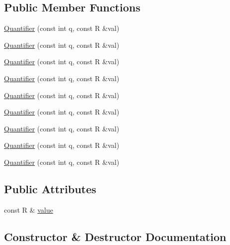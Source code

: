 \subsection*{Public Member Functions}
\begin{DoxyCompactItemize}
\item 
\mbox{\hyperlink{structfakeit_1_1Quantifier_a9eb6f158c8d585a00e03d1fdcde24af3}{Quantifier}} (const int q, const R \&val)
\item 
\mbox{\hyperlink{structfakeit_1_1Quantifier_a9eb6f158c8d585a00e03d1fdcde24af3}{Quantifier}} (const int q, const R \&val)
\item 
\mbox{\hyperlink{structfakeit_1_1Quantifier_a9eb6f158c8d585a00e03d1fdcde24af3}{Quantifier}} (const int q, const R \&val)
\item 
\mbox{\hyperlink{structfakeit_1_1Quantifier_a9eb6f158c8d585a00e03d1fdcde24af3}{Quantifier}} (const int q, const R \&val)
\item 
\mbox{\hyperlink{structfakeit_1_1Quantifier_a9eb6f158c8d585a00e03d1fdcde24af3}{Quantifier}} (const int q, const R \&val)
\item 
\mbox{\hyperlink{structfakeit_1_1Quantifier_a9eb6f158c8d585a00e03d1fdcde24af3}{Quantifier}} (const int q, const R \&val)
\item 
\mbox{\hyperlink{structfakeit_1_1Quantifier_a9eb6f158c8d585a00e03d1fdcde24af3}{Quantifier}} (const int q, const R \&val)
\item 
\mbox{\hyperlink{structfakeit_1_1Quantifier_a9eb6f158c8d585a00e03d1fdcde24af3}{Quantifier}} (const int q, const R \&val)
\item 
\mbox{\hyperlink{structfakeit_1_1Quantifier_a9eb6f158c8d585a00e03d1fdcde24af3}{Quantifier}} (const int q, const R \&val)
\end{DoxyCompactItemize}
\subsection*{Public Attributes}
\begin{DoxyCompactItemize}
\item 
const R \& \mbox{\hyperlink{structfakeit_1_1Quantifier_a90fd98e4a05be4480d51fcfc33307cee}{value}}
\end{DoxyCompactItemize}


\subsection{Constructor \& Destructor Documentation}
\mbox{\label{structfakeit_1_1Quantifier_a9eb6f158c8d585a00e03d1fdcde24af3}} 
